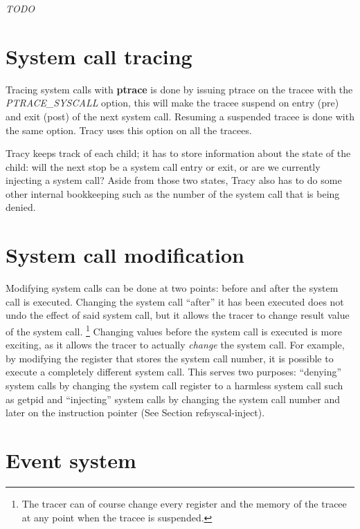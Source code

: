 \documentclass[a4paper, 10pt]{report}
\begin{document}
\textit{TODO}


\section{System call tracing}
\label{syscall-trace}

Tracing system calls with \textbf{ptrace} is done by issuing ptrace on the
tracee with the \textit{PTRACE\_SYSCALL} option, this will make the tracee
suspend on entry (pre) and exit (post) of the next system call. Resuming a
suspended tracee is done with the same option. Tracy uses this option on
all the tracees.

Tracy keeps track of each child; it has to store information about the state
of the child: will the next stop be a system call entry or exit, or are we
currently injecting a system call? Aside from those two states, Tracy also
has to do some other internal bookkeeping such as the number of the system
call that is being denied.


\section{System call modification}

Modifying system calls can be done at two points: before and after the
system call is executed. Changing the system call ``after'' it has been executed
does not undo the effect of said system call, but it allows the tracer to change
result value of the system call.
\footnote{The tracer can of course change every register and the memory of the
tracee at any point when the tracee is suspended.}
Changing values before the system call is executed is more exciting, as it
allows the tracer to actually \textit{change} the system call. For example, by
modifying the register that stores the system call number, it is possible to
execute a completely different system call. This serves two purposes:
``denying'' system calls by changing the system call register to a harmless
system call such as getpid and ``injecting'' system calls by changing the
system call number and later on the instruction pointer (See Section
ref{syscal-inject}).

\section{Event system}
\label{event-system}
\end{document}
